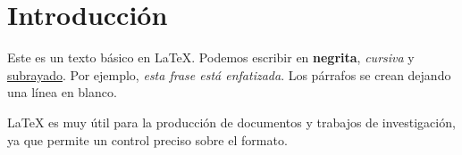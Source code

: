 \documentclass{article}
\begin{document}
\section*{Introducción}
Este es un texto básico en LaTeX. Podemos escribir en \textbf{negrita}, 
\textit{cursiva} y 
\underline{subrayado}. Por ejemplo, \emph{esta frase está enfatizada}.
Los párrafos se crean dejando una línea en blanco.

LaTeX es muy útil para la producción de documentos y 
trabajos de investigación, ya que permite un control preciso sobre el formato.
\end{document}
